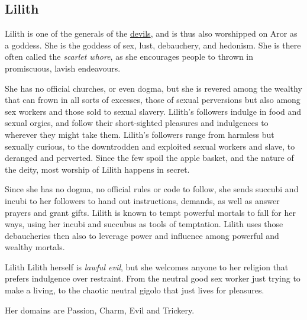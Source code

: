 \subsection{Lilith}
\label{sec:Lilith}

Lilith is one of the generals of the \hyperref[sec:Devils]{devils}, and is
thus also worshipped on Aror as a goddess. She is the goddess of sex, lust,
debauchery, and hedonism. She is there often called the \emph{scarlet whore},
as she encourages people to thrown in promiscuous, lavish endeavours.

She has no official churches, or even dogma, but she is revered among the
wealthy that can frown in all sorts of excesses, those of sexual perversions
but also among sex workers and those sold to sexual slavery. Lilith's followers
indulge in food and sexual orgies, and follow their short-sighted pleasures
and indulgences to wherever they might take them. Lilith's followers range
from harmless but sexually curious, to the downtrodden and exploited sexual
workers and slave, to deranged and perverted. Since the few spoil the apple
basket, and the nature of the deity, most worship of Lilith happens in secret.

Since she has no dogma, no official rules or code to follow, she sends succubi
and incubi to her followers to hand out instructions, demands, as well as
answer prayers and grant gifts. Lilith is known to tempt powerful mortals to
fall for her ways, using her incubi and succubus as tools of temptation. Lilith
uses those debaucheries then also to leverage power and influence among powerful
and wealthy mortals.

\begin{35e}{Lilith}
  Lilith herself is \emph{lawful evil}, but she welcomes anyone to her religion
  that prefers indulgence over restraint. From the neutral good sex worker just
  trying to make a living, to the chaotic neutral gigolo that just lives for
  pleasures.

  Her domains are Passion, Charm, Evil and Trickery.
\end{35e}
